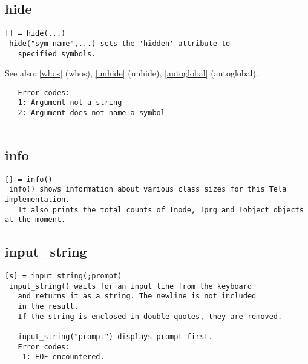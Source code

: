 \documentclass[a4paper]{article}
\begin{document}
\subsection{hide\label{hide}}

\begin{tscreen}
\begin{verbatim}
[] = hide(...)
 hide("sym-name",...) sets the 'hidden' attribute to
   specified symbols.
\end{verbatim}

See also: \ref{whos} {(whos)}, \ref{unhide} {(unhide)}, \ref{autoglobal} {(autoglobal)}.
\begin{verbatim}
   Error codes:
   1: Argument not a string
   2: Argument does not name a symbol
   
\end{verbatim}
\end{tscreen}



\subsection{info\label{info}}

\begin{tscreen}
\begin{verbatim}
[] = info()
 info() shows information about various class sizes for this Tela implementation.
   It also prints the total counts of Tnode, Tprg and Tobject objects at the moment. 
\end{verbatim}
\end{tscreen}



\subsection{input\_string\label{input_string}}

\begin{tscreen}
\begin{verbatim}
[s] = input_string(;prompt)
 input_string() waits for an input line from the keyboard
   and returns it as a string. The newline is not included
   in the result.
   If the string is enclosed in double quotes, they are removed.

   input_string("prompt") displays prompt first.
   Error codes:
   -1: EOF encountered. 
\end{verbatim}
\end{tscreen}
\end{document}
